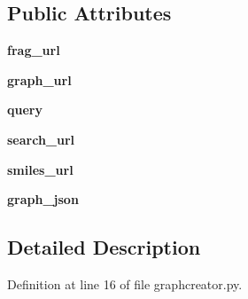 \subsection*{Public Attributes}
\begin{DoxyCompactItemize}
\item 
\mbox{\label{classfragalysis__api_1_1xcanalyser_1_1graphcreator_1_1_graph_request_ac1d452fb3f9d6e80ba3a31e02145d043}} 
{\bfseries frag\+\_\+url}
\item 
\mbox{\label{classfragalysis__api_1_1xcanalyser_1_1graphcreator_1_1_graph_request_a8c195076876c81b0beada67b8757caf2}} 
{\bfseries graph\+\_\+url}
\item 
\mbox{\label{classfragalysis__api_1_1xcanalyser_1_1graphcreator_1_1_graph_request_a6f74c9499e8e158b9416880b3c7133a6}} 
{\bfseries query}
\item 
\mbox{\label{classfragalysis__api_1_1xcanalyser_1_1graphcreator_1_1_graph_request_a212573c4bde168c0fd5563124284e569}} 
{\bfseries search\+\_\+url}
\item 
\mbox{\label{classfragalysis__api_1_1xcanalyser_1_1graphcreator_1_1_graph_request_a9659e3db8ca34a5f3bb7c3186df87fe0}} 
{\bfseries smiles\+\_\+url}
\item 
\mbox{\label{classfragalysis__api_1_1xcanalyser_1_1graphcreator_1_1_graph_request_a564113897c119dfd6dcd066b12d1f481}} 
{\bfseries graph\+\_\+json}
\end{DoxyCompactItemize}


\subsection{Detailed Description}


Definition at line 16 of file graphcreator.\+py.



